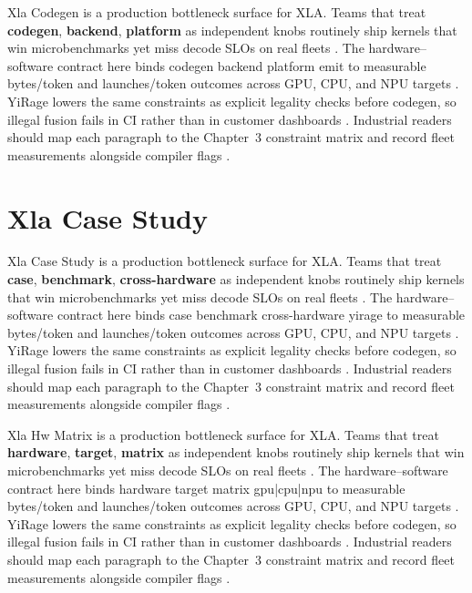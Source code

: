Xla Codegen is a production bottleneck surface for XLA. Teams that treat \textbf{codegen}, \textbf{backend}, \textbf{platform} as independent knobs routinely ship kernels that win microbenchmarks yet miss decode SLOs on real fleets \citep{nvidia2022hopper,amd2024aie}. The hardware--software contract here binds codegen backend platform emit to measurable bytes/token and launches/token outcomes across GPU, CPU, and NPU targets \citep{semianalysis2024tma,dlbook}. YiRage lowers the same constraints as explicit legality checks before codegen, so illegal fusion fails in CI rather than in customer dashboards \citep{amd2024xdna,dao2022flashattention}. Industrial readers should map each paragraph to the Chapter~3 constraint matrix and record fleet measurements alongside compiler flags \citep{amd2024aie,kwon2023vllm}.

\section{Xla Case Study}
\label{sec:xla_case_study}

Xla Case Study is a production bottleneck surface for XLA. Teams that treat \textbf{case}, \textbf{benchmark}, \textbf{cross-hardware} as independent knobs routinely ship kernels that win microbenchmarks yet miss decode SLOs on real fleets \citep{semianalysis2024tma,dlbook}. The hardware--software contract here binds case benchmark cross-hardware yirage to measurable bytes/token and launches/token outcomes across GPU, CPU, and NPU targets \citep{amd2024xdna,dao2022flashattention}. YiRage lowers the same constraints as explicit legality checks before codegen, so illegal fusion fails in CI rather than in customer dashboards \citep{amd2024aie,kwon2023vllm}. Industrial readers should map each paragraph to the Chapter~3 constraint matrix and record fleet measurements alongside compiler flags \citep{dlbook,nvidia2024cudagraphs}.

Xla Hw Matrix is a production bottleneck surface for XLA. Teams that treat \textbf{hardware}, \textbf{target}, \textbf{matrix} as independent knobs routinely ship kernels that win microbenchmarks yet miss decode SLOs on real fleets \citep{memoryfloor2026,amd2024xdna}. The hardware--software contract here binds hardware target matrix gpu|cpu|npu to measurable bytes/token and launches/token outcomes across GPU, CPU, and NPU targets \citep{nvidia2022hopper,amd2024aie}. YiRage lowers the same constraints as explicit legality checks before codegen, so illegal fusion fails in CI rather than in customer dashboards \citep{semianalysis2024tma,dlbook}. Industrial readers should map each paragraph to the Chapter~3 constraint matrix and record fleet measurements alongside compiler flags \citep{amd2024xdna,dao2022flashattention}.

